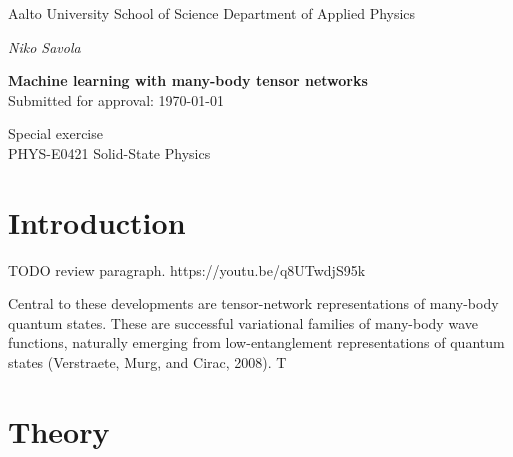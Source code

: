 

\lfoot{}
\cfoot{}
\rfoot{\thepage}


\usepackage[braket, qm]{qcircuit}  %




\begin{titlepage}
    {\sffamily
    \noindent
    \fontsize{12}{14}\selectfont
    Aalto University \newline
    School of Science \newline
    Department of Applied Physics

    \vspace{40mm}

    \noindent
    \fontsize{14}{16}\selectfont
    \emph{Niko Savola}

    \vspace{10mm}

    \noindent
    \fontsize{18}{22}\selectfont
    \textbf{Machine learning with many-body tensor networks}\\

    \fontsize{12}{14}\selectfont
    \noindent
    Submitted for approval: \today

    \vspace{70mm}

    \noindent
    Special exercise \\[4mm]
    PHYS-E0421 \textendash{} Solid-State Physics \\[4mm]
    } %

\end{titlepage}
\newpage


\section{Introduction}

TODO review paragraph.
https://youtu.be/q8UTwdjS95k

Central to these developments are
tensor-network representations of many-body quantum states.
These are successful variational families of many-body wave
functions, naturally emerging from low-entanglement representations of quantum states (Verstraete, Murg, and Cirac,
2008). T

\section{Theory}


